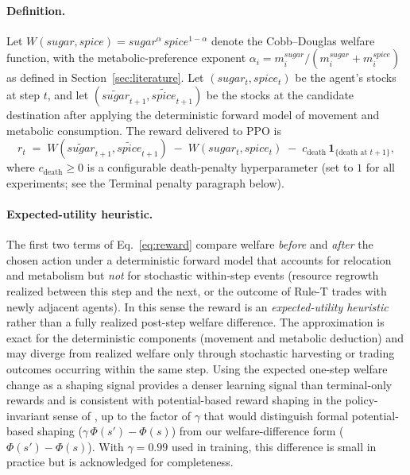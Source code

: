 \documentclass[pdflatex,sn-mathphys-num]{sn-jnl}%
\theoremstyle{thmstyleone}%
\theoremstyle{thmstyletwo}%
\theoremstyle{thmstylethree}%
\begin{document}
\paragraph{Definition.}
Let $W(sugar, spice) = sugar^{\alpha}\,spice^{1-\alpha}$ denote the Cobb--Douglas welfare function, with the metabolic-preference exponent $\alpha_i = m_i^{sugar} / (m_i^{sugar} + m_i^{spice})$ as defined in Section~\ref{sec:literature}.  
Let $(sugar_t, spice_t)$ be the agent's stocks at step $t$, and let $(\widetilde{sugar}_{t+1}, \widetilde{spice}_{t+1})$ be the stocks at the candidate destination after applying the deterministic forward model of movement and metabolic consumption.  
The reward delivered to PPO is
\begin{equation}
r_t \;=\; W(\widetilde{sugar}_{t+1}, \widetilde{spice}_{t+1}) \;-\; W(sugar_t, spice_t) \;-\; c_{\text{death}}\,\mathbf{1}_{\{\text{death at } t+1\}},
\label{eq:reward}
\end{equation}
where $c_{\text{death}} \geq 0$ is a configurable death-penalty hyperparameter (set to $1$ for all experiments; see the Terminal penalty paragraph below).

\paragraph{Expected-utility heuristic.}
The first two terms of Eq.~\eqref{eq:reward} compare welfare \emph{before} and \emph{after} the chosen action under a deterministic forward model that accounts for relocation and metabolism but \emph{not} for stochastic within-step events (resource regrowth realized between this step and the next, or the outcome of Rule-T trades with newly adjacent agents).  
In this sense the reward is an \emph{expected-utility heuristic} rather than a fully realized post-step welfare difference.  
The approximation is exact for the deterministic components (movement and metabolic deduction) and may diverge from realized welfare only through stochastic harvesting or trading outcomes occurring within the same step.  
Using the expected one-step welfare change as a shaping signal provides a denser learning signal than terminal-only rewards and is consistent with potential-based reward shaping in the policy-invariant sense of \citet{Ng1999}, up to the factor of $\gamma$ that would distinguish formal potential-based shaping ($\gamma\,\Phi(s') - \Phi(s)$) from our welfare-difference form ($\Phi(s') - \Phi(s)$).  
With $\gamma = 0.99$ used in training, this difference is small in practice but is acknowledged for completeness.
\end{document}
